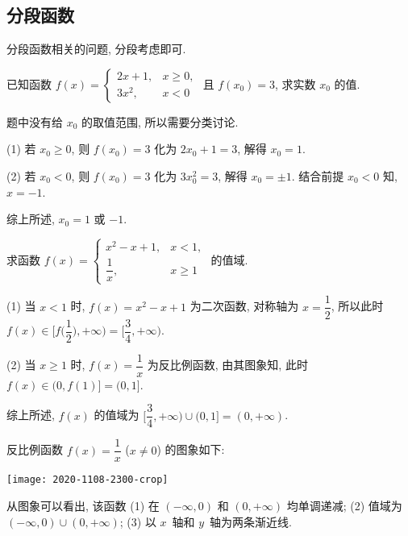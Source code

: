 \subsection{分段函数}

分段函数相关的问题, 分段考虑即可.

\begin{example}
    已知函数 $f(x)=\begin{cases}
        2x+1, & x\geqslant 0,\\
        3x^2, & x<0
    \end{cases}$ 且 $f(x_0)=3$, 求实数 $x_0$ 的值.
\end{example}
\begin{solution}
    题中没有给 $x_0$ 的取值范围, 所以需要分类讨论.
    
    (1) 若 $x_0\geqslant 0$, 则 $f(x_0)=3$ 化为 $2x_0+1=3$, 解得 $x_0=1$.
    
    (2) 若 $x_0< 0$, 则 $f(x_0)=3$ 化为 $3x_0^2=3$, 解得 $x_0=\pm1$. 结合前提 $x_0< 0$ 知, $x=-1$.
    
    综上所述, $x_0=1$ 或 $-1$.
\end{solution}

\begin{example}
    求函数 $f(x)=\begin{cases}
        x^2-x+1, & x< 1,\\
        \dfrac1x, & x\geqslant 1
    \end{cases}$ 的值域.
\end{example}
\begin{solution}
    (1) 当 $x<1$ 时, $f(x)=x^2-x+1$ 为二次函数, 对称轴为 $x=\dfrac12$, 所以此时 $f(x)\in\biggl[f\biggl(\dfrac12\biggr),+\infty\biggr)= \biggl[\dfrac34,+\infty\biggr)$.
    
    (2) 当 $x\geqslant 1$ 时, $f(x)=\dfrac1x$ 为反比例函数, 由其图象知, 此时 $f(x)\in(0,f(1)]= (0,1]$.
    
    综上所述, $f(x)$ 的值域为 $\biggl[\dfrac34,+\infty\biggr)\cup (0,1]= (0,+\infty)$.
\end{solution}
\begin{remark}
    反比例函数 $f(x)= \dfrac1x$ ($x\neq 0$) 的图象如下:
    
    \begin{center}
        \texttt{[image: 2020-1108-2300-crop]}
    \end{center}
    
    从图象可以看出, 该函数 (1) 在 $(-\infty,0)$ 和 $(0,+\infty)$ 均单调递减; (2) 值域为 $(-\infty,0)\cup (0,+\infty)$; (3) 以 $x$~轴和 $y$~轴为两条渐近线.
\end{remark}
